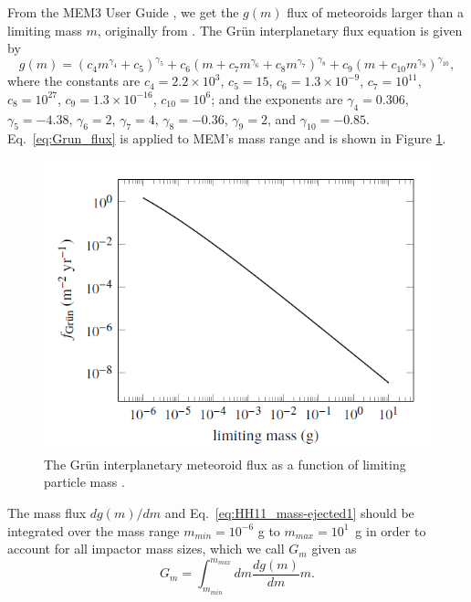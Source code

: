 \documentclass{hitec}
\numberwithin{equation}{section}
\begin{document}
From the MEM3 User Guide , we get the $g(m)$ flux of meteoroids larger than a limiting mass $m$, originally from \cite{grun1985collisional}. The Gr{\"u}n interplanetary flux equation is given by
\begin{equation}\label{eq:Grun_flux}
g(m) = (c_4m^{\gamma_4}+c_5)^{\gamma_5} + c_6(m + c_7m^{\gamma_6} + c_8m^{\gamma_7})^{\gamma_8} + c_9(m + c_{10}m^{\gamma_9})^{\gamma_{10}},
\end{equation}
where the constants are $c_4 = 2.2\times 10^3$, $c_5 = 15$, $c_6 = 1.3 \times 10^{-9}$, $c_7=10^{11}$, $c_8=10^{27}$, $c_9 = 1.3\times 10^{-16}$, $c_{10} = 10^6$; and the exponents are $\gamma_4 = 0.306$, $\gamma_5 = -4.38$, $\gamma_6 = 2$, $\gamma_7 = 4$, $\gamma_8 = -0.36$, $\gamma_{9} = 2$, and $\gamma_{10} = -0.85$. Eq.\ \ref{eq:Grun_flux} is applied to MEM's mass range and is shown in Figure \ref{fig:MEM_UG_Fig2.1_partile-mass-distribution}.

\begin{figure}[h!]
	\centering
	\includegraphics[scale=0.65]{MEM_UG_Fig2.1_partile-mass-distribution.PNG}
	\caption{The Gr{\"u}n interplanetary meteoroid flux as a function of limiting particle mass \citep[Figure 1]{moorhead2019nasa}.}\label{fig:MEM_UG_Fig2.1_partile-mass-distribution}
\end{figure}

The mass flux $dg(m)/dm$ and Eq.\ \ref{eq:HH11_mass-ejected1} should be integrated over the mass range $m_{min} = 10^{-6}$ g to $m_{max} = 10^1$~g in order to account for all impactor mass sizes, which we call $G_m$ given as
\begin{equation}\label{eq:Gm_integral}
G_m = \int_{m_{min}}^{m_{max}}dm\frac{dg(m)}{dm}m.
\end{equation}
\end{document}
